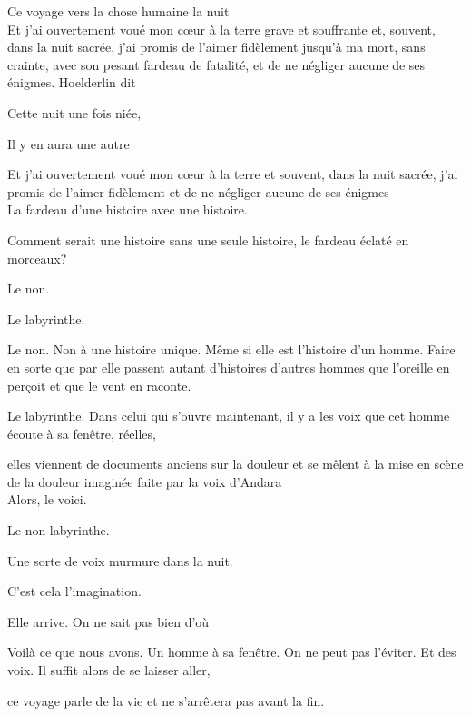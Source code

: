 \breakk

\clearpage
\thispagestyle{empty}
\movetooddpage

\vspace*{4cm}

Ce voyage vers la chose humaine la nuit\\

Et j'ai ouvertement voué mon cœur à la terre grave et souffrante et,
souvent, dans la nuit sacrée, j'ai promis de l'aimer fidèlement jusqu'à
ma mort, sans crainte, avec son pesant fardeau de fatalité, et de ne
négliger aucune de ses énigmes. Hoelderlin dit

Cette nuit une fois niée,

Il y en aura une autre

Et j'ai ouvertement voué mon cœur à la terre et souvent, dans la nuit
sacrée, j'ai promis de l'aimer fidèlement et de ne négliger aucune de
ses énigmes\\

La fardeau d'une histoire avec une histoire.

Comment serait une histoire sans une seule histoire, le fardeau éclaté
en morceaux?

Le non.

Le labyrinthe.

Le non. Non à une histoire unique. Même si elle est l'histoire d'un
homme. Faire en sorte que par elle passent autant d'histoires d'autres
hommes que l'oreille en perçoit et que le vent en raconte.

Le labyrinthe. Dans celui qui s'ouvre maintenant, il y a les voix que
cet homme écoute à sa fenêtre, réelles,

elles viennent de documents anciens sur la douleur et se mêlent à la
mise en scène de la douleur imaginée faite par la voix d'Andara\\

Alors, le voici.

Le non labyrinthe.

\breakk

\vspace*{4cm}

Une sorte de voix murmure dans la nuit.

C'est cela l'imagination.

Elle arrive. On ne sait pas bien d'où

Voilà ce que nous avons. Un homme à sa fenêtre. On ne peut pas l'éviter.
Et des voix. Il suffit alors de se laisser aller,

ce voyage parle de la vie et ne s'arrêtera pas avant la fin.\\

